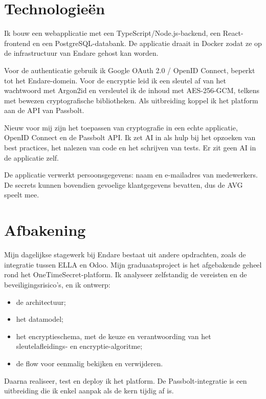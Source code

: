 
\section{Technologieën}%
\label{vst:technologieen}

Ik bouw een webapplicatie met een TypeScript/Node.js-backend, een
React-frontend en een PostgreSQL-databank. De applicatie draait in Docker
zodat ze op de infrastructuur van Endare gehost kan worden.

Voor de authenticatie gebruik ik Google OAuth 2.0 / OpenID Connect, beperkt
tot het Endare-domein. Voor de encryptie leid ik een sleutel af van het
wachtwoord met Argon2id en versleutel ik de inhoud met AES-256-GCM, telkens
met bewezen cryptografische bibliotheken. Als uitbreiding koppel ik het
platform aan de API van Passbolt.

Nieuw voor mij zijn het toepassen van cryptografie in een echte applicatie,
OpenID Connect en de Passbolt API. Ik zet AI in als hulp bij het opzoeken
van best practices, het nalezen van code en het schrijven van tests. Er zit
geen AI in de applicatie zelf.

De applicatie verwerkt persoonsgegevens: naam en e-mailadres van
medewerkers. De secrets kunnen bovendien gevoelige klantgegevens bevatten,
dus de AVG speelt mee.


\section{Afbakening}%
\label{vst:afbakening}

Mijn dagelijkse stagewerk bij Endare bestaat uit andere opdrachten, zoals de
integratie tussen ELLA en Odoo. Mijn graduaatsproject is het afgebakende
geheel rond het OneTimeSecret-platform. Ik analyseer zelfstandig de vereisten
en de beveiligingsrisico's, en ik ontwerp:
\begin{itemize}
  \item de architectuur;
  \item het datamodel;
  \item het encryptieschema, met de keuze en verantwoording van het
        sleutelafleidings- en encryptie-algoritme;
  \item de flow voor eenmalig bekijken en verwijderen.
\end{itemize}
Daarna realiseer, test en deploy ik het platform. De Passbolt-integratie is
een uitbreiding die ik enkel aanpak als de kern tijdig af is.

